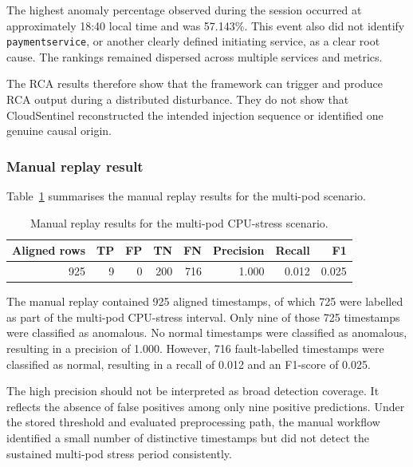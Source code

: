 The highest anomaly percentage observed during the session occurred at approximately 18:40 local time and was 57.143\%. This event also did not identify \texttt{paymentservice}, or another clearly defined initiating service, as a clear root cause. The rankings remained dispersed across multiple services and metrics.

The RCA results therefore show that the framework can trigger and produce RCA output during a distributed disturbance. They do not show that CloudSentinel reconstructed the intended injection sequence or identified one genuine causal origin.

\subsubsection{Manual replay result}

Table~\ref{tab:multipod-manual-detection-results} summarises the manual replay results for the multi-pod scenario.

\begin{table}[htbp]
    \centering
    \small
    \caption{Manual replay results for the multi-pod CPU-stress scenario.}
    \label{tab:multipod-manual-detection-results}
    \begin{tabular}{r r r r r r r r}
        \toprule
        \textbf{Aligned rows} & \textbf{TP} & \textbf{FP} & \textbf{TN} & \textbf{FN} & \textbf{Precision} & \textbf{Recall} & \textbf{F1} \\
        \midrule
        925 & 9 & 0 & 200 & 716 & 1.000 & 0.012 & 0.025 \\
        \bottomrule
    \end{tabular}
\end{table}

The manual replay contained 925 aligned timestamps, of which 725 were labelled as part of the multi-pod CPU-stress interval. Only nine of those 725 timestamps were classified as anomalous. No normal timestamps were classified as anomalous, resulting in a precision of 1.000. However, 716 fault-labelled timestamps were classified as normal, resulting in a recall of 0.012 and an F1-score of 0.025.

The high precision should not be interpreted as broad detection coverage. It reflects the absence of false positives among only nine positive predictions. Under the stored threshold and evaluated preprocessing path, the manual workflow identified a small number of distinctive timestamps but did not detect the sustained multi-pod stress period consistently.

